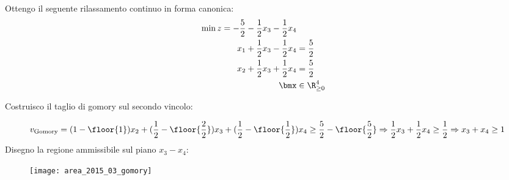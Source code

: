 \documentclass[\main/main.tex]{subfiles}
\begin{document}
Ottengo il seguente rilassamento continuo in forma canonica:
\begin{align*}
  \min z = -\frac{5}{2}-\frac{1}{2} x_3 -\frac{1}{2} x_4    \\
  x_1 + \frac{1}{2}x_3 - \frac{1}{2}x_4 & = \frac{5}{2}     \\
  x_2 + \frac{1}{2}x_3 + \frac{1}{2}x_4 & = \frac{5}{2}     \\
  \bmx                                  & \in \R^4_{\geq 0}
\end{align*}

Costruisco il taglio di gomory sul secondo vincolo:

\[
  v_{\text{Gomory}} = (1-\floor{1})x_2 + (\frac{1}{2} - \floor{\frac{2}{2}})x_3 + (\frac{1}{2} - \floor{\frac{1}{2}})x_4 \geq \frac{5}{2} - \floor{\frac{5}{2}} \Rightarrow \frac{1}{2}x_3 + \frac{1}{2}x_4 \geq \frac{1}{2} \Rightarrow x_3 + x_4 \geq 1
\]
Disegno la regione ammissibile sul piano $x_3-x_4$:

\begin{figure}
  \texttt{[image: area\_2015\_03\_gomory]}
\end{figure}
\end{document}
